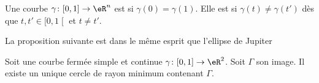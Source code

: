 \begin{definition}
    Une courbe \( \gamma\colon \mathopen[ 0 , 1 \mathclose]\to \eR^n\) est  si \( \gamma(0)=\gamma(1)\). Elle est  si \( \gamma(t)\neq \gamma(t')\) dès que \( t,t'\in\mathopen[ 0 , 1 \mathclose[\) et \( t\neq  t'\).
\end{definition}

La proposition suivante est dans le même esprit que l'ellipse de Jupiter
\begin{propositionDef}      \label{PROPDEFooCWESooVbDven}
    Soit une courbe fermée simple et continue \( \gamma\colon \mathopen[ 0 , 1 \mathclose]\to \eR^2\). Soit \( \Gamma\) son image. Il existe un unique cercle de rayon minimum contenant \( \Gamma\).
\end{propositionDef}

